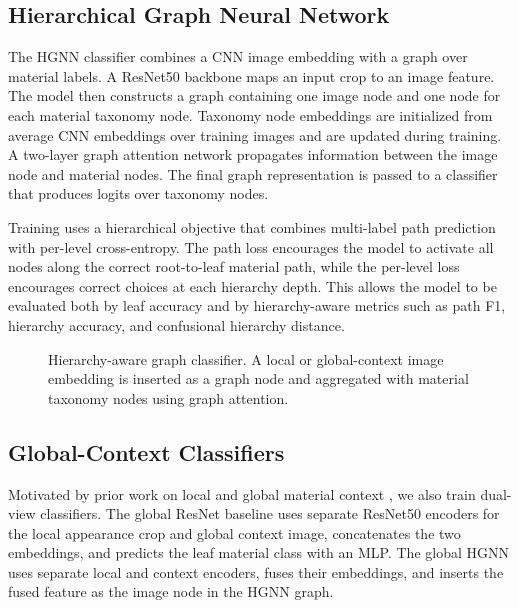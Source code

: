 \documentclass[11pt,twocolumn,letterpaper]{article}
\begin{document}
\subsection{Hierarchical Graph Neural Network}

The HGNN classifier combines a CNN image embedding with a graph over material labels. A ResNet50 backbone maps an input crop to an image feature. The model then constructs a graph containing one image node and one node for each material taxonomy node. Taxonomy node embeddings are initialized from average CNN embeddings over training images and are updated during training. A two-layer graph attention network propagates information between the image node and material nodes. The final graph representation is passed to a classifier that produces logits over taxonomy nodes.

Training uses a hierarchical objective that combines multi-label path prediction with per-level cross-entropy. The path loss encourages the model to activate all nodes along the correct root-to-leaf material path, while the per-level loss encourages correct choices at each hierarchy depth. This allows the model to be evaluated both by leaf accuracy and by hierarchy-aware metrics such as path F1, hierarchy accuracy, and confusional hierarchy distance.

\begin{figure}[t]
    \centering
    \caption{Hierarchy-aware graph classifier. A local or global-context image embedding is inserted as a graph node and aggregated with material taxonomy nodes using graph attention.}
    \label{fig:hgnn_architecture}
\end{figure}

\subsection{Global-Context Classifiers}

Motivated by prior work on local and global material context \cite{schwartz2016}, we also train dual-view classifiers. The global ResNet baseline uses separate ResNet50 encoders for the local appearance crop and global context image, concatenates the two embeddings, and predicts the leaf material class with an MLP. The global HGNN uses separate local and context encoders, fuses their embeddings, and inserts the fused feature as the image node in the HGNN graph.
\end{document}
